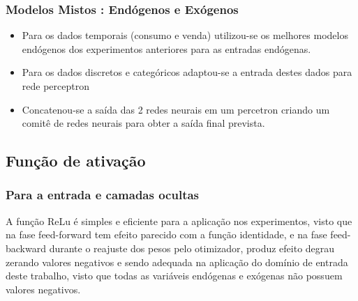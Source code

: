 \documentclass[	12pt, Times, openright, twoside, a4paper, english, brazil]{abntex2}
\begin{document}
            \subsubsection{Modelos Mistos : Endógenos e Exógenos}
                \begin{itemize}
                    \item Para os dados temporais (consumo e venda) utilizou-se os melhores modelos endógenos dos experimentos anteriores para as entradas endógenas. 
                    \item Para os dados discretos e categóricos adaptou-se a entrada destes dados para rede perceptron
                    \item  Concatenou-se a saída das 2 redes neurais em um percetron criando um comitê de redes neurais para obter a saída final prevista.
                \end{itemize}
	\subsection{Função de ativação}
	    \begin{figure}[H]
        	 \label{fig:activation_functions}
        \end{figure}
	    \subsubsection{Para a entrada e camadas ocultas}
    	    A função ReLu é simples e eficiente para a aplicação nos experimentos, visto que na fase feed-forward tem efeito parecido com a função identidade, e na fase feed-backward durante o reajuste dos pesos pelo otimizador, produz efeito degrau zerando valores negativos e sendo adequada na aplicação do domínio de entrada deste trabalho, visto que todas as variáveis endógenas e exógenas não possuem valores negativos.
\end{document}

